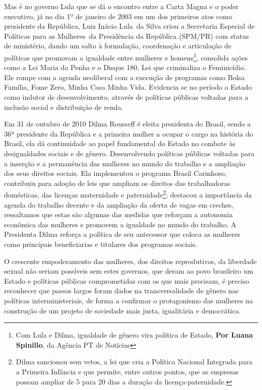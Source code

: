 Mas é no governo Lula que se dá o encontro entre a Carta Magna e o poder
executivo, já no dia 1º de janeiro de 2003 em um dos primeiros atos como
presidente da República, Luiz
Inácio Lula~da Silva criou
a Secretaria Especial de Políticas para as
Mulheres~da Presidência da República (SPM/PR) com status de ministério,
dando um salto à formulação, coordenação e articulação de políticas que
promovam a igualdade entre mulheres e homens\footnote{Com Lula e Dilma, igualdade de gênero vira política de Estado, \textbf{Por Luana Spinillo}, da Agência PT de
  Notícias}, consolida ações como a Lei Maria da Penha
e o Disque 180, Lei que criminaliza o Feminicídio. Ele rompe com a
agenda neoliberal com a execução de programas como Bolsa Família, Fome
Zero, Minha Casa Minha Vida. Evidencia se no período o Estado como
indutor de desenvolvimento, através de políticas públicas voltadas para
a inclusão social e distribuição de renda.

Em 31 de outubro de 2010 Dilma Rousseff é eleita presidenta do Brasil,
sendo a 36ª presidente da República e a primeira mulher a ocupar o cargo
na história do Brasil, ela dá continuidade ao papel fundamental do
Estado no combate às desigualdades sociais e de gênero. Desenvolvendo
políticas públicas voltadas para a inserção e a permanência das mulheres
no mundo do trabalho e a ampliação dos seus direitos sociais. Ela
implementou o programa Brasil Carinhoso, contribuiu para adoção de leis
que ampliam os direitos das trabalhadoras domésticas, das licenças
maternidade e paternidade\footnote{Dilma sancionou sem vetos, a lei que
  cria a Política Nacional Integrada para a Primeira Infância e que
  permite, entre outros pontos, que as empresas possam ampliar de 5 para
  20 dias a duração da licença-paternidade.}; destacou a importância da
agenda do trabalho decente e da ampliação da oferta de vagas em creches,
ressaltamos que estas são algumas das medidas que reforçam a autonomia
econômica das mulheres e promovem a igualdade no mundo do trabalho. A
Presidenta Dilma reforça a política de seu antecessor que coloca as
mulheres como principais beneficiarias e titulares dos programas
sociais.

O crescente empoderamento das mulheres, dos direitos reprodutivos, da
liberdade sexual não seriam possíveis sem estes governos, que deram ao
povo brasileiro um Estado e políticas públicas comprometidas com os que
mais precisam, é preciso reconhecer que passos largos foram dados na
transversalidade de gênero nas políticas interministeriais, de forma a
confirmar o protagonismo das mulheres na construção de um projeto de
sociedade mais justa, igualitária e democrática.

